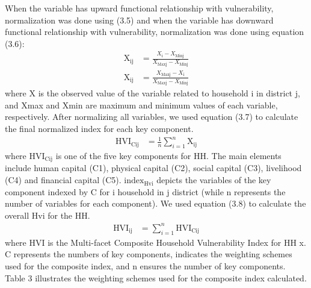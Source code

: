 \documentclass[12pt, a4paper]{article}
\begin{document}
When the variable has upward functional relationship with vulnerability, normalization was done using (3.5) and when the variable has downward functional relationship with vulnerability, normalization was done using equation (3.6):
\begin{align}
	\text{X}_{\text{ij}} &= \frac{X_{\text{i}} - X_{\text{Minj}}}{X_{\text{Maxj}} - X_{\text{Minj}}} \tag{3.5} \\[1cm] 	
	\text{X}_{\text{ij}} &= \frac{X_{\text{Maxj}} - X_{\text{i}}}{X_{\text{Maxj}} - X_{\text{Minj}}} \tag{3.6}
\end{align} 
where X is the observed value of the variable related to household i in district j, and Xmax and Xmin are 
maximum and minimum values of each variable, respectively. After normalizing all variables, 
we used equation (3.7) to calculate the final normalized index for each key component.
\begin{align}
	\text{HVI}_{\text{Cij}} &= \frac{1}{n}\sum_{i=1}^{n}\text{X}_{\text{ij}} \tag{3.7}
\end{align}
where $\text{HVI}_{\text{Cij}}$ is one of the five key components for HH. The main elements include human capital (C1), physical capital (C2), social capital (C3), livelihood (C4) and financial capital (C5). 	$\text{index}_{\text{Hvi}}$
depicts the variables of the key component indexed by C for i household in j district (while n represents the number of variables for each component). We used equation (3.8) to 
calculate the overall Hvi for the HH.
\begin{align}
	\text{HVI}_{\text{ij}} &= \sum_{i=1}^{n}\text{HVI}_{\text{Cij}} \tag{3.8}
\end{align}
where HVI is the Multi-facet Composite Household Vulnerability Index for HH x. 
C represents the numbers of key components,  indicates the weighting schemes used for the 
composite index, and n ensures the number of key components. Table 3 illustrates the weighting 
schemes used for the composite index calculated. 
\end{document}
